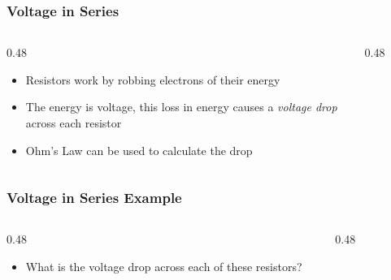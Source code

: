 \begin{frame}
    \frametitle{Voltage in Series}
    \begin{columns}
        \begin{column}{0.48\linewidth}
            \begin{itemize}[<+- | alert@+>]
                \item Resistors work by robbing electrons of their energy
                \item The energy is voltage, this loss in energy causes a \emph{voltage drop} across each resistor
                \item Ohm's Law can be used to calculate the drop
            \end{itemize}
        \end{column}
        \begin{column}{0.48\linewidth}
            \begin{figure}
                \centering
                \resizebox{\columnwidth}{!}{
                    
                }
            \end{figure}
        \end{column}
	\end{columns}
\end{frame}

\begin{frame}
    \frametitle{Voltage in Series Example}
    \begin{columns}
        \begin{column}{0.48\linewidth}
            \begin{itemize}
                \item What is the voltage drop across each of these resistors?
            \end{itemize}
        \end{column}
        \begin{column}{0.48\linewidth}
            \begin{figure}
                \centering
                \resizebox{\columnwidth}{!}{
                    
                }
            \end{figure}
        \end{column}
	\end{columns}
\end{frame}

